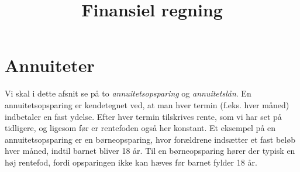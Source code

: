 \documentclass[12pt,oneside,a4paper]{article}
\title{Finansiel regning}
\date{\vspace{-5ex}}
\begin{document}
\maketitle


\section{Annuiteter}
Vi skal i dette afsnit se på to \emph{annuitetsopsparing} og
\emph{annuitetslån}.  En annuitetsopsparing er kendetegnet ved, at man hver
termin (f.eks. hver måned) indbetaler en fast ydelse. Efter hver termin
tilskrives rente, som vi har set på tidligere, og ligesom før er rentefoden også her
konstant. Et eksempel på en annuitetsopsparing er en børneopsparing, hvor forældrene
indsætter et fast beløb hver måned, indtil barnet bliver 18 år. Til en børneopsparing
hører der typisk en høj rentefod, fordi opsparingen ikke kan hæves før barnet fylder 18 år.
\end{document}
